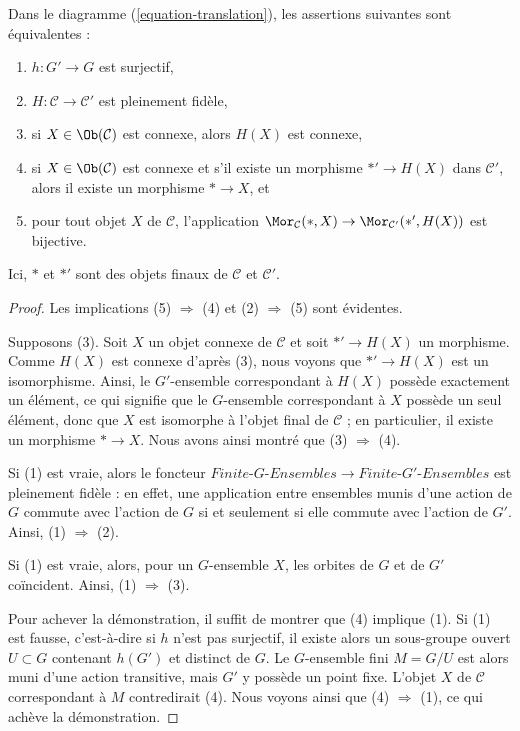 \begin{lemma}
\label{lemma-functoriality-galois-surjective}
Dans le diagramme (\ref{equation-translation}), les assertions suivantes sont équivalentes :
\begin{enumerate}
\item $h : G' \to G$ est surjectif,
\item $H : \mathcal{C} \to \mathcal{C}'$ est pleinement fidèle,
\item si $X \in \Ob(\mathcal{C})$ est connexe, alors $H(X)$ est connexe,
\item si $X \in \Ob(\mathcal{C})$ est connexe et s'il existe
un morphisme $*' \to H(X)$ dans $\mathcal{C}'$, alors
il existe un morphisme $* \to X$, et
\item pour tout objet $X$ de $\mathcal{C}$, l'application
$\Mor_\mathcal{C}(*, X) \to \Mor_{\mathcal{C}'}(*', H(X))$
est bijective.
\end{enumerate}
Ici, $*$ et $*'$ sont des objets finaux de $\mathcal{C}$ et $\mathcal{C}'$.
\end{lemma}

\begin{proof}
Les implications (5) $\Rightarrow$ (4) et (2) $\Rightarrow$ (5) sont évidentes.

\medskip\noindent
Supposons (3). Soit $X$ un objet connexe de $\mathcal{C}$ et soit
$*' \to H(X)$ un morphisme. Comme $H(X)$ est connexe d'après (3),
nous voyons que $*' \to H(X)$ est un isomorphisme. Ainsi, le $G'$-ensemble
correspondant à $H(X)$ possède exactement un élément, ce qui signifie que le
$G$-ensemble correspondant à $X$ possède un seul élément, donc que $X$ est
isomorphe à l'objet final de $\mathcal{C}$ ; en particulier,
il existe un morphisme $* \to X$. Nous avons ainsi montré que (3) $\Rightarrow$ (4).

\medskip\noindent
Si (1) est vraie, alors le foncteur
$\textit{Finite-}G\textit{-Ensembles} \to \textit{Finite-}G'\textit{-Ensembles}$
est pleinement fidèle : en effet, une application entre ensembles munis d'une action de $G$ commute avec
l'action de $G$ si et seulement si elle commute avec l'action de $G'$.
Ainsi, (1) $\Rightarrow$ (2).

\medskip\noindent
Si (1) est vraie, alors, pour un $G$-ensemble $X$, les orbites de $G$ et de $G'$
coïncident. Ainsi, (1) $\Rightarrow$ (3).

\medskip\noindent
Pour achever la démonstration, il suffit de montrer que (4) implique (1).
Si (1) est fausse, c'est-à-dire si $h$ n'est pas surjectif, il existe alors
un sous-groupe ouvert $U \subset G$ contenant $h(G')$ et distinct
de $G$. Le $G$-ensemble fini $M = G/U$ est alors muni d'une action transitive,
mais $G'$ y possède un point fixe. L'objet $X$ de $\mathcal{C}$
correspondant à $M$ contredirait (4). Nous voyons ainsi que
(4) $\Rightarrow$ (1), ce qui achève la démonstration.
\end{proof}

